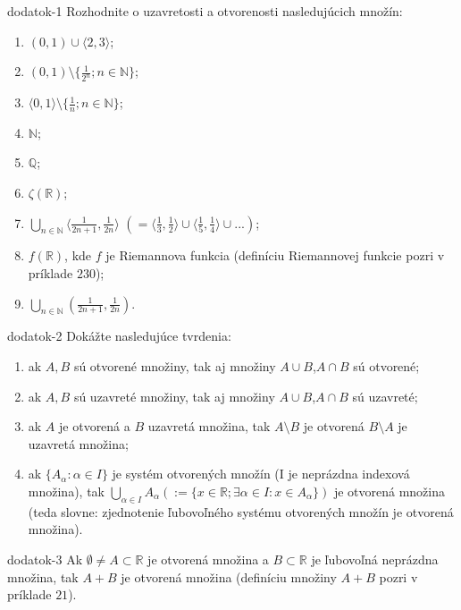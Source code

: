 \begin{defproblem}{dodatok-1}
Rozhodnite o uzavretosti a otvorenosti nasledujúcich množín:
\begin{multicols}{2}
\begin{enumerate}
    \item $(0,1) \cup \langle 2,3 \rangle$;
    \item $(0,1) \setminus \{\frac{1}{2^n}; n \in \mathbb{N}\}$;
    \item $\langle 0,1 \rangle \setminus \{\frac{1}{n}; n \in \mathbb{N}\}$;
    \item $\mathbb{N}$;
    \item $\mathbb{Q}$;
    \item $\zeta(\mathbb{R})$;
    \item $\bigcup_{n \in \mathbb{N}} \langle \frac{1}{2n+1},\frac{1}{2n} \rangle$  $(= \langle \frac{1}{3},\frac{1}{2} \rangle \cup \langle \frac{1}{5},\frac{1}{4} \rangle \cup ...)$;
    \item $f(\mathbb{R})$, kde $f$ je Riemannova funkcia (definíciu Riemannovej funkcie pozri v príklade $230$);
    \item $\bigcup_{n \in \mathbb{N}} (\frac{1}{2n+1},\frac{1}{2n})$.
\end{enumerate}
\end{multicols}
\end{defproblem}

\begin{defproblem}{dodatok-2}
Dokážte nasledujúce tvrdenia:
\begin{enumerate}
\item ak $A,B$ sú otvorené množiny, tak aj množiny $A \cup B$,$A \cap B$ sú otvorené;
\item ak $A,B$ sú uzavreté množiny, tak aj množiny $A \cup B$,$A \cap B$ sú uzavreté;
\item ak $A$ je otvorená a $B$ uzavretá množina, tak $A \setminus B$ je otvorená $B \setminus A$ je uzavretá množina;
\item ak $\{A_{\alpha}: \alpha \in I\}$ je systém otvorených množín (I je neprázdna indexová množina), tak $\bigcup_{\alpha \in I} A_\alpha (:=\{x \in \mathbb{R}; \exists \alpha \in I: x \in A_\alpha\})$ je otvorená množina (teda slovne: zjednotenie ľubovoľného systému otvorených množín je otvorená množina).
\end{enumerate}
\end{defproblem}

\begin{defproblem}{dodatok-3}
Ak $\emptyset \neq A \subset \mathbb{R}$ je otvorená množina a $B \subset \mathbb{R}$ je ľubovoľná neprázdna množina, tak $A+B$ je otvorená množina (definíciu množiny $A+B$ pozri v príklade $21$).
\end{defproblem}

